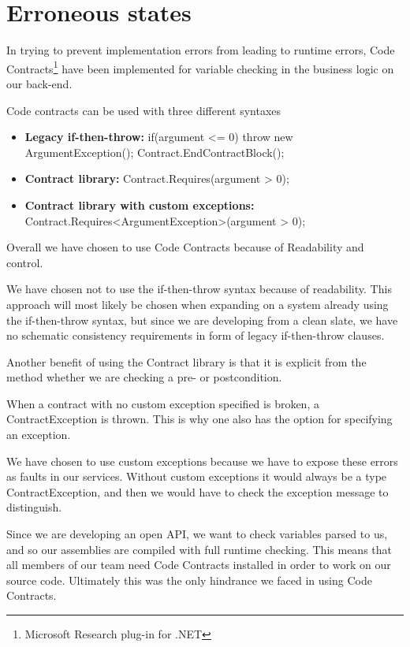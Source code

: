 \documentclass[../report.tex]{subfiles}
\begin{document}
\section{Erroneous states}

In trying to prevent implementation errors from leading to runtime errors, Code Contracts\footnote{Microsoft Research plug-in for .NET} have been implemented for variable checking in the business logic on our back-end.

Code contracts can be used with three different syntaxes

\begin{itemize}
\item \textbf{Legacy if-then-throw:}
\subitem if(argument <= 0) throw new ArgumentException();  
\subitem Contract.EndContractBlock();

\item \textbf{Contract library:}
\subitem Contract.Requires(argument > 0);

\item \textbf{Contract library with custom exceptions:}
\subitem Contract.Requires<ArgumentException>(argument > 0);
\end{itemize}

Overall we have chosen to use Code Contracts because of Readability and control.

We have chosen not to use the if-then-throw syntax because of readability. This approach will most likely be chosen when expanding on a system already using the if-then-throw syntax, but since we are developing from a clean slate, we have no schematic consistency requirements in form of legacy if-then-throw clauses.

Another benefit of using the Contract library is that it is explicit from the method whether we are checking a pre- or postcondition.

When a contract with no custom exception specified is broken, a ContractException is thrown. This is why one also has the option for specifying an exception.

We have chosen to use custom exceptions because we have to expose these errors as faults in our services. Without custom exceptions it would always be a type ContractException, and then we would have to check the exception message to distinguish.

Since we are developing an open API, we want to check variables parsed to us, and so our assemblies are compiled with full runtime checking. This means that all members of our team need Code Contracts installed in order to work on our source code. Ultimately this was the only hindrance we faced in using Code Contracts.
\end{document}
